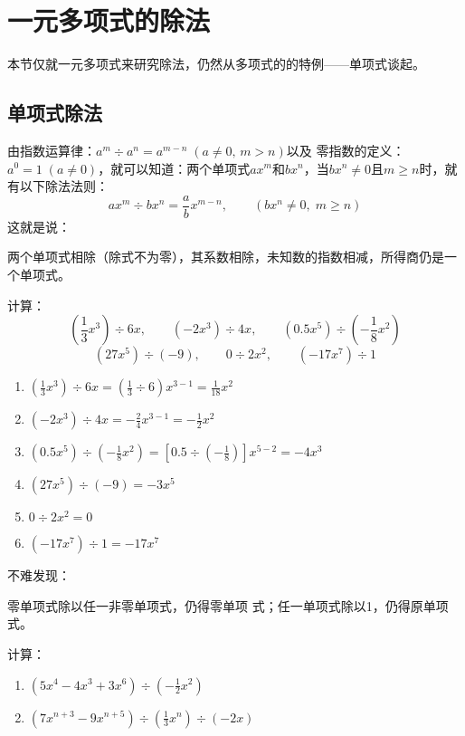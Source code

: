 \section{一元多项式的除法}
本节仅就一元多项式来研究除法，仍然从多项式的的特例——单项式谈起。
\subsection{单项式除法}
由指数运算律：$a^m\div a^n=a^{m-n}\; (a\ne 0,\, m>n)$以及
零指数的定义：$a^0=1\; (a\ne 0)$，就可以知道：两个单项式$ax^m$和$bx^n$，当$bx^n\ne 0$且$m\ge n$时，就有以下除法法则：
\[ax^m\div bx^n =\frac{a}{b}x^{m-n},\qquad (bx^n\ne 0,\; m\ge n) \]
这就是说：

\begin{blk}{}
    两个单项式相除（除式不为零），其系数相除，未知数的指数相减，所得商仍是一个单项式。
\end{blk}

\begin{example}
计算：
\[\left(\frac{1}{3}x^3\right)\div 6x,\qquad (-2x^3)\div 4x,\qquad (0.5x^5)\div \left(-\frac{1}{8}x^2\right)\]
\[(27x^5)\div (-9),\qquad 0\div 2x^2,\qquad (-17x^7)\div 1\]
\end{example}

\begin{solution}
    \begin{enumerate}
        \item $\left(\frac{1}{3}x^3\right)\div 6x=\left(\frac{1}{3}\div 6\right)x^{3-1}=\frac{1}{18}x^2$
        \item $(-2x^3)\div 4x=-\frac{2}{4}x^{3-1}=-\frac{1}{2}x^2$
        \item $(0.5x^5)\div \left(-\frac{1}{8}x^2\right)=\left[0.5\div \left(-\frac{1}{8}\right)\right]x^{5-2}=-4x^3$
        \item $(27x^5)\div (-9)=-3x^5$
        \item $0\div 2x^2=0$
        \item $(-17x^7)\div 1=-17x^7$
    \end{enumerate}
\end{solution}

不难发现：
\begin{blk}{}
    零单项式除以任一非零单项式，仍得零单项
    式；任一单项式除以1，仍得原单项式。
\end{blk}

\begin{example}
  计算：
\begin{enumerate}
    \item $(5x^4-4x^3+3x^6)\div \left(-\frac{1}{2}x^2\right)$
    \item $(7x^{n+3}-9x^{n+5})\div \left(\frac{1}{3}x^n\right)\div (-2x)$
\end{enumerate}
\end{example}

